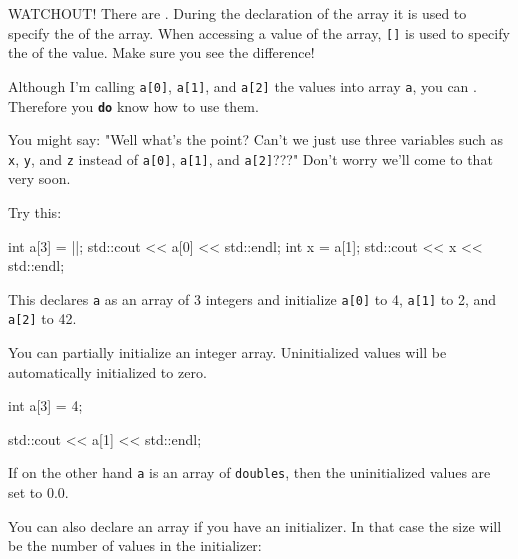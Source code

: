 WATCHOUT! There are . During the declaration of the array it is used to specify the  of the array. When accessing a value of the array, \texttt{[]} is used to specify the  of the value. Make sure you see the difference!

Although I'm calling \texttt{a[0]}, \texttt{a[1]}, and \texttt{a[2]} the values into array \texttt{a}, you can . Therefore you \texttt\textbf{do} know how to use them.

You might say: "Well what's the point? Can't we just use three variables such as \texttt{x}, \texttt{y}, and \texttt{z} instead of \texttt{a[0]}, \texttt{a[1]}, and \texttt{a[2]}???" Don't worry we'll come to that very soon.



\newpage{}

Try this:

\begin{consolethree}[escapeinside=||]
int a[3] = ||;
std::cout << a[0] << std::endl;
int x = a[1];
std::cout << x << std::endl;  
\end{consolethree}

This declares \texttt{a} as an array of 3 integers and initialize \texttt{a[0]} to 4, \texttt{a[1]} to 2, and \texttt{a[2]} to 42.


You can partially initialize an integer array. Uninitialized values will be automatically initialized to zero.

\begin{consolethree}[escapeinside=||]
int a[3] = {4};

std::cout << a[1] << std::endl;
\end{consolethree}

If on the other hand \texttt{a} is an array of \texttt{doubles}, then the uninitialized values are set to 0.0.

You can also declare an array  if you have an initializer. In that case the size will be the number of values in the initializer:

